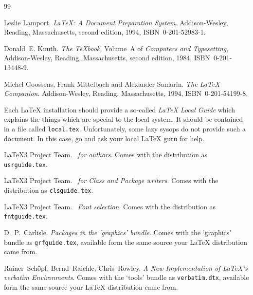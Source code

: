 ﻿%
\begin{thebibliography}{99}
 Leslie Lamport.  \newblock \emph{{\LaTeX:} A Document
    Preparation System}.  \newblock Addison-Wesley, Reading,
  Massachusetts, second edition, 1994, ISBN~0-201-52983-1.
  
 Donald~E. Knuth.  \newblock \textit{The \TeX{}book,}
  Volume~A of \textit{Computers and Typesetting}, Addison-Wesley,
  Reading, Massachusetts, second edition, 1984, ISBN~0-201-13448-9.

 Michel Goossens, Frank Mittelbach and Alexander
  Samarin.  \newblock \emph{The {\LaTeX} Companion}.  \newblock
  Addison-Wesley, Reading, Massachusetts, 1994, ISBN~0-201-54199-8.
 
 Each \LaTeX{} installation should provide a so-called
  \emph{\LaTeX{} Local Guide} which explains the things which are
  special to the local system.  It should be contained in a file called
  \texttt{local.tex}. Unfortunately, some lazy sysops do not provide such a
  document. In this case, go and ask your local \LaTeX{} guru for help.
 
 \LaTeX3 Project Team.  \newblock \emph{\LaTeXe~for
    authors}.  \newblock Comes with the \LaTeXe{} distribution as
  \texttt{usrguide.tex}.

 \LaTeX3 Project Team.  \newblock \emph{\LaTeXe~for
    Class and Package writers}.  \newblock Comes with the \LaTeXe{}
  distribution as \texttt{clsguide.tex}.

 \LaTeX3 Project Team.  \newblock \emph{\LaTeXe~Font
    selection}.  \newblock Comes with the \LaTeXe{} distribution as
  \texttt{fntguide.tex}.

 D.~P.~Carlisle.  \newblock \emph{Packages in the
    `graphics' bundle}.  \newblock Comes with the `graphics' bundle as
  \texttt{grfguide.tex}, available form the same source your \LaTeX{}
  distribution came from.

 Rainer~Sch\"opf, Bernd~Raichle, Chris~Rowley.  
\newblock \emph{A New Implementation of \LaTeX's verbatim
  Environments}.
 \newblock Comes with the `tools' bundle as
  \texttt{verbatim.dtx}, available form the same source your \LaTeX{}
  distribution came from. 


\end{thebibliography}
